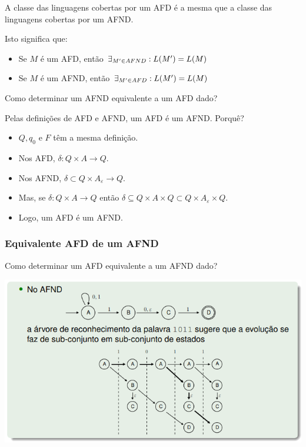 \documentclass{article}
\begin{document}
\begin{flushleft}
  \item A classe das linguagens cobertas por um AFD é a mesma que a classe das linguagens
  cobertas por um AFND.
  \item Isto significa que:
  \begin{itemize}
    \item Se $M$ é um AFD, então $\exists_{M\rq \in AFND} : L(M\rq) = L(M)$
    \item Se $M$ é um AFND, então $\exists_{M\rq \in AFD} : L(M\rq) = L(M)$
  \end{itemize}
  \item  Como determinar um AFND equivalente a um AFD dado?
  \item Pelas definições de AFD e AFND, um AFD é um AFND. Porquê?
  \begin{itemize}
    \item $Q, q_0$ e $F$ têm a mesma definição.
    \item Nos AFD, $\delta : Q \times A \longrightarrow Q$.
    \item Nos AFND, $\delta \subset Q \times A_\varepsilon \longrightarrow Q$.
    \item Mas, se $\delta : Q \times A \longrightarrow Q$ então $\delta \subseteq Q \times A \times Q \subset Q \times A_\varepsilon \times Q$.
    \item Logo, um AFD é um AFND.
  \end{itemize}

  \subsubsection{Equivalente AFD de um AFND}

  Como determinar um AFD equivalente a um AFND dado?

  \begin{center}
    \includegraphics[scale=0.4]{53}
  \end{center}


\end{flushleft}
\end{document}
